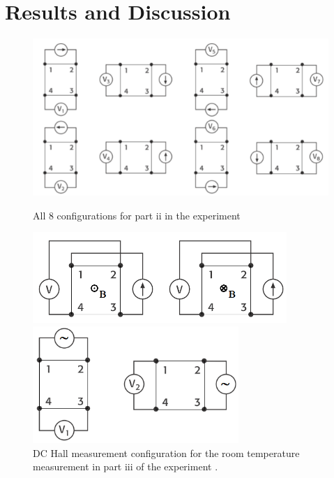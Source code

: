 \documentclass[twocolumn]{article}
\begin{document}
\section{Results and Discussion}
\begin{figure}
\begin{minipage}{\textwidth}
\includegraphics[width=\linewidth]{four-contact.png}
\caption{All 8 configurations for part ii in the experiment \cite{ref:3}}
\label{fig:9}
\end{minipage}
\vfill
\begin{minipage}{0.46\textwidth}
\includegraphics[width=\linewidth]{room-temp-config.png}
\caption{DC Hall measurement configuration for the room temperature measurement 
in part iii of the experiment \cite{ref:3}.}
\label{fig:10}
\end{minipage}
\hfill
\begin{minipage}{0.46\textwidth}
\includegraphics[width=\linewidth]{res-temp-config.png}

\end{minipage}
\end{figure}
\end{document}
